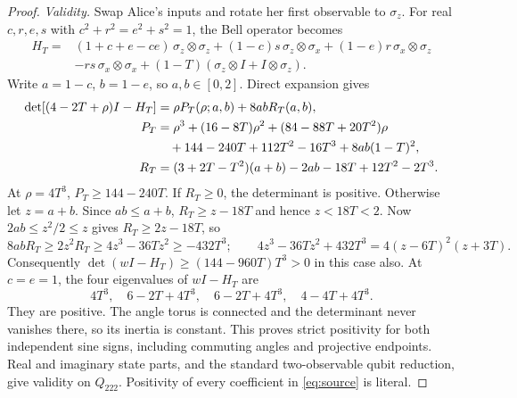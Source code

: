 \documentclass[11pt]{article}
\begin{document}
\begin{proof}
\emph{Validity.}
Swap Alice's inputs and rotate her first observable to $\sigma_z$.
For real $c,r,e,s$ with $c^2+r^2=e^2+s^2=1$, the Bell operator becomes
\begin{align*}
 H_T={}&(1+c+e-ce)\,\sigma_z\otimes\sigma_z
 +(1-c)s\,\sigma_z\otimes\sigma_x
 +(1-e)r\,\sigma_x\otimes\sigma_z\\
 &-rs\,\sigma_x\otimes\sigma_x
 +(1-T)(\sigma_z\otimes I+I\otimes\sigma_z).
\end{align*}
Write $a=1-c$, $b=1-e$, so $a,b\in[0,2]$. Direct expansion gives
\begin{align}
 \det[(4-2T+\rho)I-H_T]
 &=\rho P_T(\rho;a,b)+8abR_T(a,b),                 \label{eq:det}\\
 P_T&=\rho^3+(16-8T)\rho^2+(84-88T+20T^2)\rho\notag\\
 &\quad+144-240T+112T^2-16T^3+8ab(1-T)^2,\notag\\
 R_T&=(3+2T-T^2)(a+b)-2ab-18T+12T^2-2T^3.\notag
\end{align}
At $\rho=4T^3$, $P_T\ge144-240T$. If $R_T\ge0$, the determinant
is positive. Otherwise let $z=a+b$. Since $ab\le a+b$,
$R_T\ge z-18T$ and hence $z<18T<2$. Now $2ab\le z^2/2\le z$
gives $R_T\ge2z-18T$, so
\[
 8abR_T\ge2z^2R_T\ge4z^3-36Tz^2\ge-432T^3;
 \qquad
 4z^3-36Tz^2+432T^3=4(z-6T)^2(z+3T).
\]
Consequently
$\det(wI-H_T)\ge(144-960T)T^3>0$ in this case also.
At $c=e=1$, the four eigenvalues of $wI-H_T$ are
\[
 4T^3,\quad6-2T+4T^3,\quad6-2T+4T^3,\quad4-4T+4T^3.
\]
They are positive. The angle torus is connected and the determinant
never vanishes there, so its inertia is constant. This proves strict
positivity for both independent sine signs, including commuting
angles and projective endpoints. Real and imaginary state parts, and
the standard two-observable qubit reduction, give validity on
$Q_{222}$. Positivity of every coefficient in \eqref{eq:source} is literal.


\end{proof}
\end{document}
